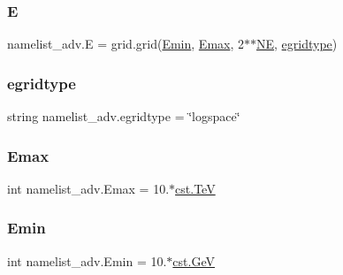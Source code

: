\mbox{\label{namespacenamelist__adv_ab6b530a81ecfe119f973191c6dcc3d81}} 
\subsubsection{\texorpdfstring{E}{E}}
{\footnotesize\ttfamily namelist\+\_\+adv.\+E = grid.\+grid(\hyperlink{namespacenamelist__adv_ae74400866e865444c31335e45a93e54d}{Emin}, \hyperlink{namespacenamelist__adv_a9f50ca5d1e2f2b537147f28ea52f91db}{Emax}, 2$\ast$$\ast$\hyperlink{namespacenamelist__adv_a5668c25615adb1dd63f996c9a1971e80}{NE}, \hyperlink{namespacenamelist__adv_a47a2f058b75fa8d56c35c29994678050}{egridtype})}

\mbox{\label{namespacenamelist__adv_a47a2f058b75fa8d56c35c29994678050}} 
\subsubsection{\texorpdfstring{egridtype}{egridtype}}
{\footnotesize\ttfamily string namelist\+\_\+adv.\+egridtype = \char`\"{}logspace\char`\"{}}

\mbox{\label{namespacenamelist__adv_a9f50ca5d1e2f2b537147f28ea52f91db}} 
\subsubsection{\texorpdfstring{Emax}{Emax}}
{\footnotesize\ttfamily int namelist\+\_\+adv.\+Emax = 10.$\ast$\hyperlink{constants_8h_a7f801e1f6821bc6baf0652ed2496e5e9}{cst.\+TeV}}

\mbox{\label{namespacenamelist__adv_ae74400866e865444c31335e45a93e54d}} 
\subsubsection{\texorpdfstring{Emin}{Emin}}
{\footnotesize\ttfamily int namelist\+\_\+adv.\+Emin = 10.$\ast$\hyperlink{constants_8h_aec0e126d9991db8ad0b26139f5860568}{cst.\+GeV}}

